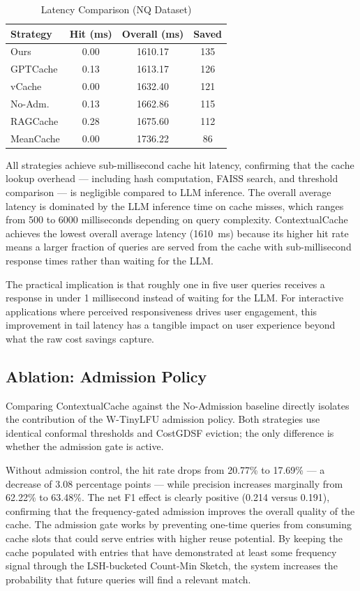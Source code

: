 \documentclass[conference]{IEEEtran}
\begin{document}
\begin{table}[t]
\centering
\caption{Latency Comparison (NQ Dataset)}
\label{tab:latency}
\begin{tabular}{lccc}
\toprule
\textbf{Strategy} & \textbf{Hit (ms)} & \textbf{Overall (ms)} & \textbf{Saved} \\
\midrule
Ours & 0.00 & 1610.17 & 135 \\
GPTCache & 0.13 & 1613.17 & 126 \\
vCache & 0.00 & 1632.40 & 121 \\
No-Adm. & 0.13 & 1662.86 & 115 \\
RAGCache & 0.28 & 1675.60 & 112 \\
MeanCache & 0.00 & 1736.22 & 86 \\
\bottomrule
\end{tabular}
\end{table}

All strategies achieve sub-millisecond cache hit latency, confirming that the cache lookup overhead --- including hash computation, FAISS search, and threshold comparison --- is negligible compared to LLM inference. The overall average latency is dominated by the LLM inference time on cache misses, which ranges from 500 to 6000 milliseconds depending on query complexity. ContextualCache achieves the lowest overall average latency (1610~ms) because its higher hit rate means a larger fraction of queries are served from the cache with sub-millisecond response times rather than waiting for the LLM.

The practical implication is that roughly one in five user queries receives a response in under 1 millisecond instead of waiting for the LLM. For interactive applications where perceived responsiveness drives user engagement, this improvement in tail latency has a tangible impact on user experience beyond what the raw cost savings capture.

\subsection{Ablation: Admission Policy}

Comparing ContextualCache against the No-Admission baseline directly isolates the contribution of the W-TinyLFU admission policy. Both strategies use identical conformal thresholds and CostGDSF eviction; the only difference is whether the admission gate is active.

Without admission control, the hit rate drops from 20.77\% to 17.69\% --- a decrease of 3.08 percentage points --- while precision increases marginally from 62.22\% to 63.48\%. The net F1 effect is clearly positive (0.214 versus 0.191), confirming that the frequency-gated admission improves the overall quality of the cache. The admission gate works by preventing one-time queries from consuming cache slots that could serve entries with higher reuse potential. By keeping the cache populated with entries that have demonstrated at least some frequency signal through the LSH-bucketed Count-Min Sketch, the system increases the probability that future queries will find a relevant match.
\end{document}
